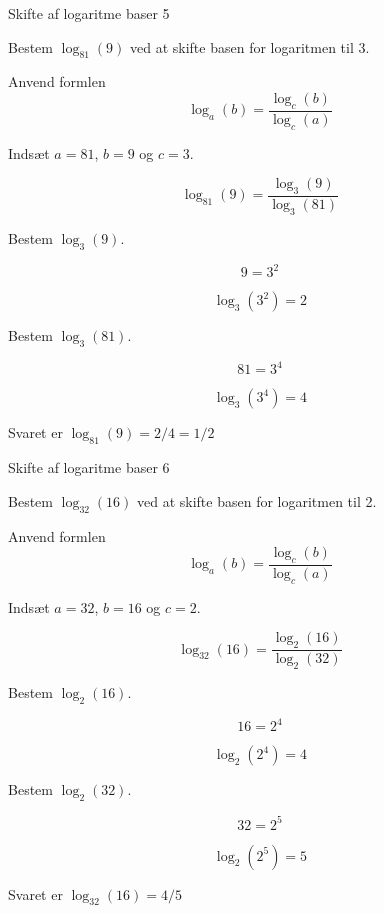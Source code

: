 \documentclass{article}
\begin{document}
\newpage
\begin{exercise}{Skifte af logaritme baser 5}
	
	Bestem $\log_{81}(9)$ ved at skifte basen for logaritmen til 3.
	
	
	\hint
	
	Anvend formlen 
	\[
	\log_a(b) = \frac{\log_c(b)}{\log_c(a)}
	\]
	
	\hint
	
	Indsæt $a=81$, $b=9$ og $c=3$.
	
	\hint
	\[
	\log_{81}(9) = \frac{\log_3(9)}{\log_3(81)}
	\]
	
	\hint
	Bestem $\log_3(9)$.
	
	\hint
	\[
	9  = 3^2	
	\]
	
	
	\hint
	\[
	\log_3(3^2) = 2
	\]
	
	\hint
	Bestem $\log_3(81)$.
	
	\hint
	\[
	81  = 3^4
	\]
	
	\hint
	\[
	\log_3(3^4) = 4
	\]
	
	\hint
	Svaret er 	$\log_{81}(9) = 2/4 = 1/2$
	
	
\end{exercise}

\newpage
\begin{exercise}{Skifte af logaritme baser 6}
	
	Bestem $\log_{32}(16)$ ved at skifte basen for logaritmen til 2.
	
	
	\hint
	
	Anvend formlen 
	\[
	\log_a(b) = \frac{\log_c(b)}{\log_c(a)}
	\]
	
	\hint
	
	Indsæt $a=32$, $b=16$ og $c=2$.
	
	\hint
	\[
	\log_{32}(16) = \frac{\log_2(16)}{\log_2(32)}
	\]
	
	\hint
	Bestem $\log_2(16)$.
	
	\hint
	\[
	16  = 2^4	
	\]
	
	
	\hint
	\[
	\log_2(2^4) = 4
	\]
	
	\hint
	Bestem $\log_2(32)$.
	
	\hint
	\[
	32  = 2^5
	\]
	
	\hint
	\[
	\log_2(2^5) = 5
	\]
	
	\hint
	Svaret er 	$\log_{32}(16) = 4/5$
	
	
\end{exercise}
\end{document}
